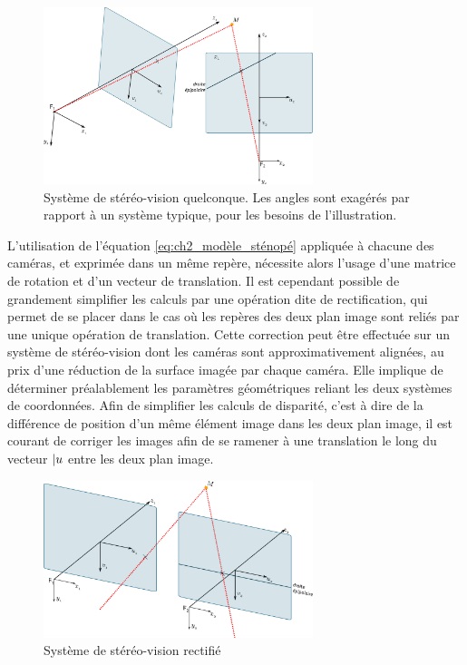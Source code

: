 \begin{figure}[h]
		\begin{center}
			\includegraphics[width=0.7\textwidth]{Chapter2/graphics/stereo_model_random.png}
			\caption{Système de stéréo-vision quelconque. Les angles sont exagérés par rapport à un système typique, pour les besoins de l'illustration.}
			\label{fig:ch2_stereo_quelconque}
		\end{center}
\end{figure}

L'utilisation de l'équation \ref{eq:ch2_modèle_sténopé} appliquée à chacune des caméras, et exprimée dans un même repère, nécessite alors l'usage d'une matrice de rotation et d'un vecteur de translation. Il est cependant possible de grandement simplifier les calculs par une opération dite de \og rectification\fg{}, qui permet de se placer dans le cas où les repères des deux plan image sont reliés par une unique opération de translation. Cette correction peut être effectuée sur un système de stéréo-vision dont les caméras sont approximativement alignées, au prix d'une réduction de la surface imagée par chaque caméra. Elle implique de déterminer préalablement les paramètres géométriques reliant les deux systèmes de coordonnées. Afin de simplifier les calculs de disparité, c'est à dire de la différence de position d'un même élément image dans les deux plan image, il est courant de corriger les images afin de se ramener à une translation le long du vecteur $\arrowvert{u}$ entre les deux plan image.

\begin{figure}[h]
	\begin{center}
		\includegraphics[width=0.7\textwidth]{Chapter2/graphics/stereo_model_rectified.png}
		\caption{Système de stéréo-vision rectifié}
		\label{fig:ch2_stereo_rectifié}
	\end{center}
\end{figure}

